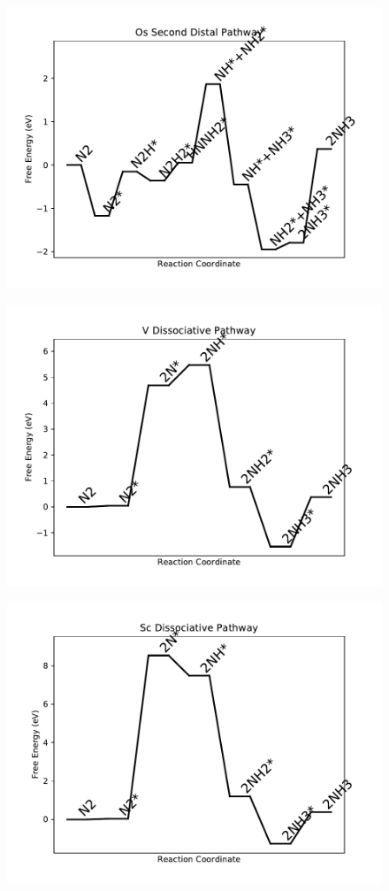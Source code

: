 \begin{figure}
\centering
\includegraphics[width=0.8\linewidth]{data/plots/Os_distal_2.pdf}
\end{figure}

\begin{figure}
\centering
\includegraphics[width=0.8\linewidth]{data/plots/V_dissociative.pdf}
\end{figure}

\begin{figure}
\centering
\includegraphics[width=0.8\linewidth]{data/plots/Sc_dissociative.pdf}
\end{figure}

